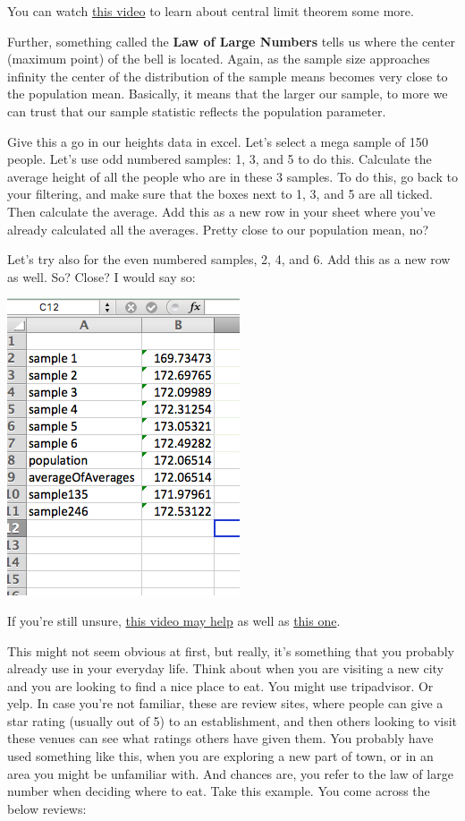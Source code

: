 \documentclass[]{book}
\theoremstyle{definition}
\theoremstyle{definition}
\theoremstyle{definition}
\theoremstyle{remark}
\begin{document}
You can watch \href{https://www.youtube.com/watch?v=JNm3M9cqWyc}{this
video} to learn about central limit theorem some more.

Further, something called the \textbf{Law of Large Numbers} tells us
where the center (maximum point) of the bell is located. Again, as the
sample size approaches infinity the center of the distribution of the
sample means becomes very close to the population mean. Basically, it
means that the larger our sample, to more we can trust that our sample
statistic reflects the population parameter.

Give this a go in our heights data in excel. Let's select a mega sample
of 150 people. Let's use odd numbered samples: 1, 3, and 5 to do this.
Calculate the average height of all the people who are in these 3
samples. To do this, go back to your filtering, and make sure that the
boxes next to 1, 3, and 5 are all ticked. Then calculate the average.
Add this as a new row in your sheet where you've already calculated all
the averages. Pretty close to our population mean, no?

Let's try also for the even numbered samples, 2, 4, and 6. Add this as a
new row as well. So? Close? I would say so:

\includegraphics{imgs/larger_samples.png}

If you're still unsure,
\href{https://www.youtube.com/watch?v=agBcvkyi6sg}{this video may help}
as well as \href{https://www.youtube.com/watch?v=iN-77YVqLDw}{this one}.

This might not seem obvious at first, but really, it's something that
you probably already use in your everyday life. Think about when you are
visiting a new city and you are looking to find a nice place to eat. You
might use tripadvisor. Or yelp. In case you're not familiar, these are
review sites, where people can give a star rating (usually out of 5) to
an establishment, and then others looking to visit these venues can see
what ratings others have given them. You probably have used something
like this, when you are exploring a new part of town, or in an area you
might be unfamiliar with. And chances are, you refer to the law of large
number when deciding where to eat. Take this example. You come across
the below reviews:
\end{document}

